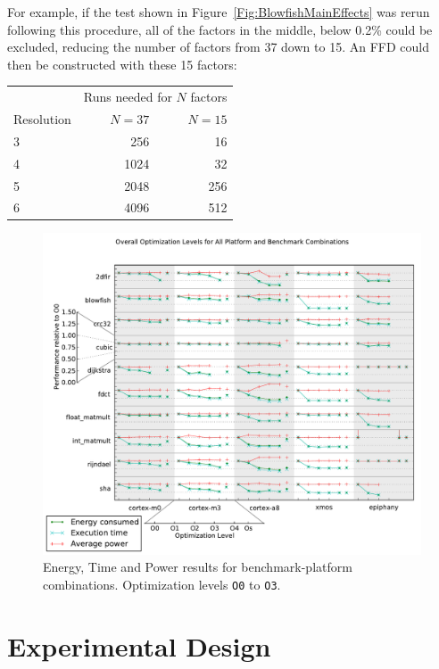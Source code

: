 \documentclass[twocolumn]{article}
\newcommand{\nsection}[1]{\section{\bfseries #1}}
\let\oldcaption\caption
\renewcommand{\caption}[1]{\oldcaption{\textup{#1}}}
\begin{document}
For example, if the test shown in Figure~\ref{Fig:BlowfishMainEffects} was rerun following this procedure, all of the factors in the middle, below 0.2\% could be excluded, reducing the number of factors from 37 down to 15. An FFD could then be constructed with these 15 factors:

\begin{center}
\begin{tabular}{l r r}
	& \multicolumn{2}{c}{Runs needed for $N$ factors} \\
	Resolution & \hspace{5mm}$N=37$ & $N=15$ \\
	\hline
	3 & 256	   & 16 \\
	4 & 1024   & 32 \\
	5 & 2048   & 256 \\
	6 & 4096   & 512 \\
\end{tabular}
\end{center}

\begin{figure}[tb!]
	\centering
	\includegraphics[width=\textwidth,clip, trim=0cm 0cm 0 2.1cm]{levels.pdf}
	\caption{Energy, Time and Power results for benchmark-platform combinations. Optimization levels \texttt{O0} to \texttt{O3}.}
	\label{Fig:OverallView}
\end{figure}

\nsection{Experimental Design}
\end{document}
